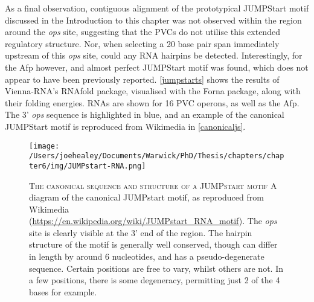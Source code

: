 As a final observation, contiguous alignment of the prototypical JUMPStart motif discussed in the Introduction to this chapter was not observed within the region around the \emph{ops} site, suggesting that the PVCs do not utilise this extended regulatory structure.
Nor, when selecting a 20 base pair span immediately upstream of this \emph{ops} site, could any RNA hairpins be detected. Interestingly, for the Afp however, and almost perfect JUMPStart motif was found, which does not appear to have been previously reported. \vref{jumpstarts} shows the results of Vienna-RNA's RNAfold package, visualised with the Forna package, along with their folding energies. RNAs are shown for 16 PVC operons, as well as the Afp. The 3' \emph{ops} sequence is highlighted in blue, and an example of the canonical JUMPStart motif is reproduced from Wikimedia in \vref{canonicaljs}.


\begin{figure}[h]
\centering
    \texttt{[image: /Users/joehealey/Documents/Warwick/PhD/Thesis/chapters/chapter6/img/JUMPstart-RNA.png]}
    \captionsetup{singlelinecheck=off, justification=justified, font=footnotesize, aboveskip=10pt}
    \caption[The canoncial semi-degenerate JUMPstart motif]{\textsc{\normalsize The canonical sequence and structure of a JUMPstart motif} \vspace{0.1cm} \newline A diagram of the canonical JUMPstart motif, as reproduced from Wikimedia (\url{https://en.wikipedia.org/wiki/JUMPstart_RNA_motif}). The \emph{ops} site is clearly visible at the 3' end of the region. The hairpin structure of the motif is generally well conserved, though can differ in length by around 6 nucleotides, and has a pseudo-degenerate sequence. Certain positions are free to vary, whilst others are not. In a few positions, there is some degeneracy, permitting just 2 of the 4 bases for example.}
\label{canonicaljs}
\end{figure}




